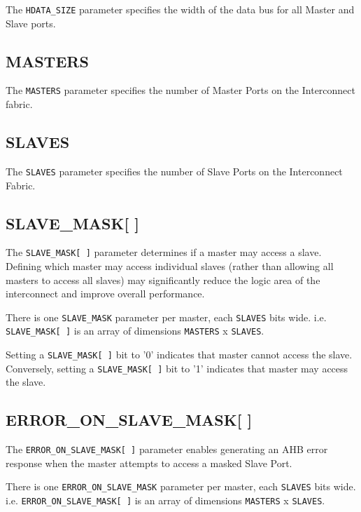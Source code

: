 The \texttt{HDATA\_SIZE} parameter specifies the width of the data bus for all
Master and Slave ports.

\subsection{MASTERS}\label{masters}

The \texttt{MASTERS} parameter specifies the number of Master Ports on the
Interconnect fabric.

\subsection{SLAVES}\label{slaves}

The \texttt{SLAVES} parameter specifies the number of Slave Ports on the
Interconnect Fabric.

\subsection{SLAVE\_MASK[ ]}\label{slave_mask}

The \texttt{SLAVE\_MASK[\,]} parameter determines if a master may access a slave. Defining which
master may access individual slaves (rather than allowing all masters to access all slaves) may
significantly reduce the logic area of the interconnect and improve overall performance.

There is one \texttt{SLAVE\_MASK} parameter per master, each \texttt{SLAVES} bits wide.
i.e. \texttt{SLAVE\_MASK[\,]} is an array of dimensions \texttt{MASTERS} x \texttt{SLAVES}.

Setting a \texttt{SLAVE\_MASK[\,]} bit to '0' indicates that master cannot access the slave.
Conversely, setting a \texttt{SLAVE\_MASK[\,]} bit to '1' indicates that master may access the slave.

\subsection{ERROR\_ON\_SLAVE\_MASK[ ]}\label{error_on_slave_mask}

The \texttt{ERROR\_ON\_SLAVE\_MASK[\,]} parameter enables generating an AHB error response when the
master attempts to access a masked Slave Port.

There is one \texttt{ERROR\_ON\_SLAVE\_MASK} parameter per master, each \texttt{SLAVES} bits wide.
i.e. \texttt{ERROR\_ON\_SLAVE\_MASK[\,]} is an array of dimensions \texttt{MASTERS} x \texttt{SLAVES}.

